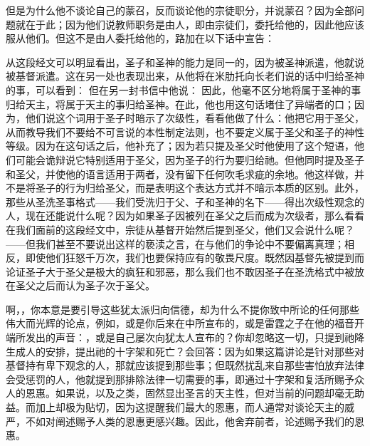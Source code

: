 但是为什么他不谈论自己的蒙召，反而谈论他的宗徒职分，并说蒙召？因为全部问题就在于此；因为他们说教师职务是由人，即由宗徒们，委托给他的，因此他应该服从他们。但这不是由人委托给他的，路加在以下话中宣告：\par

从这段经文可以明显看出，圣子和圣神的能力是同一的，因为被圣神派遣，他就说被基督派遣。这在另一处也表现出来，从他将在米肋托向长老们说的话中归给圣神的事，可以看到： 但在另一封书信中他说： 因此，他毫不区分地将属于圣神的事归给天主，将属于天主的事归给圣神。在此，他也用这句话堵住了异端者的口；因为，他们说这个词用于圣子时暗示了次级性，看看他做了什么：他把它用于圣父，从而教导我们不要给不可言说的本性制定法则，也不要定义属于圣父和圣子的神性等级。因为在这句话之后，他补充了；因为若只提及圣父时他使用了这个短语，他们可能会诡辩说它特别适用于圣父，因为圣子的行为要归给祂。但他同时提及圣子和圣父，并使他的语言适用于两者，没有留下任何吹毛求疵的余地。他这样做，并不是将圣子的行为归给圣父，而是表明这个表达方式并不暗示本质的区别。此外，那些从圣洗圣事格式——我们受洗归于父、子和圣神的名下——得出次级性观念的人，现在还能说什么呢？因为如果圣子因被列在圣父之后而成为次级者，那么看看在我们面前的这段经文中，宗徒从基督开始然后提到圣父，他们又会说什么呢？——但我们甚至不要说出这样的亵渎之言，在与他们的争论中不要偏离真理；相反，即使他们狂怒千万次，我们也要保持应有的敬畏尺度。既然因基督先被提到而论证圣子大于圣父是极大的疯狂和邪恶，那么我们也不敢因圣子在圣洗格式中被放在圣父之后而认为圣子次于圣父。\par

\par

啊，，你本意是要引导这些犹太派归向信德，却为什么不提你致中所论的任何那些伟大而光辉的论点，例如，或是你后来在中所宣布的，或是雷霆之子在他的福音开端所发出的声音：，或是自己屡次向犹太人宣布的？你却忽略这一切，只提到祂降生成人的安排，提出祂的十字架和死亡？会回答：因为如果这篇讲论是针对那些对基督持有卑下观念的人，那就应该提到那些事；但既然扰乱来自那些害怕放弃法律会受惩罚的人，他就提到那排除法律一切需要的事，即通过十字架和复活所赐予众人的恩惠。如果说，以及之类，固然显出圣言的天主性，但对当前的问题却毫无助益。而加上却极为贴切，因为这提醒我们最大的恩惠，而人通常对谈论天主的威严，不如对阐述赐予人类的恩惠更感兴趣。因此，他舍弃前者，论述赐予我们的恩惠。\par

